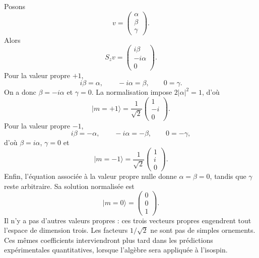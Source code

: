 Posons
\begin{equation}
v=
\begin{pmatrix}
\alpha\\
\beta\\
\gamma
\end{pmatrix}.
\end{equation}
Alors
\begin{equation}
S_zv
=
\begin{pmatrix}
i\beta\\
-i\alpha\\
0
\end{pmatrix}.
\end{equation}
Pour la valeur propre \(+1\),
\begin{equation}
i\beta=\alpha,
\qquad
-i\alpha=\beta,
\qquad
0=\gamma.
\end{equation}
On a donc \(\beta=-i\alpha\) et \(\gamma=0\). La normalisation impose \(2|\alpha|^2=1\), d’où
\begin{equation}
|m=+1\rangle
=
\frac{1}{\sqrt2}
\begin{pmatrix}
1\\
-i\\
0
\end{pmatrix}.
\end{equation}
Pour la valeur propre \(-1\),
\begin{equation}
i\beta=-\alpha,
\qquad
-i\alpha=-\beta,
\qquad
0=-\gamma,
\end{equation}
d’où \(\beta=i\alpha\), \(\gamma=0\) et
\begin{equation}
|m=-1\rangle
=
\frac{1}{\sqrt2}
\begin{pmatrix}
1\\
i\\
0
\end{pmatrix}.
\end{equation}
Enfin, l’équation associée à la valeur propre nulle donne \(\alpha=\beta=0\), tandis que \(\gamma\) reste arbitraire. Sa solution normalisée est
\begin{equation}
|m=0\rangle
=
\begin{pmatrix}
0\\
0\\
1
\end{pmatrix}.
\end{equation}
Il n’y a pas d’autres valeurs propres : ces trois vecteurs propres engendrent tout l’espace de dimension trois. Les facteurs \(1/\sqrt2\) ne sont pas de simples ornements. Ces mêmes coefficients interviendront plus tard dans les prédictions expérimentales quantitatives, lorsque l’algèbre sera appliquée à l’isospin.

